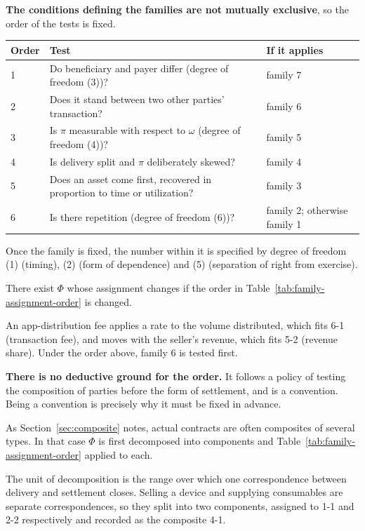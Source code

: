 \textbf{The conditions defining the families are not mutually exclusive}, so the order of
the tests is fixed.

\begin{center}
\begin{tabularx}{\textwidth}{@{}llX@{}}
\toprule
Order & Test & If it applies \\
\midrule
1 & Do beneficiary and payer differ (degree of freedom (3))? & family 7 \\
2 & Does it stand between two other parties' transaction? & family 6 \\
3 & Is $\pi$ measurable with respect to $\omega$ (degree of freedom (4))? & family 5 \\
4 & Is delivery split and $\pi$ deliberately skewed? & family 4 \\
5 & Does an asset come first, recovered in proportion to time or utilization? & family 3 \\
6 & Is there repetition (degree of freedom (6))? & family 2; otherwise family 1 \\
\bottomrule
\end{tabularx}
\label{tab:family-assignment-order}
\end{center}

Once the family is fixed, the number within it is specified by degree of freedom (1)
(timing), (2) (form of dependence) and (5) (separation of right from exercise).

\begin{remark}
\label{rem:assignment-order-dependence}
There exist $\Phi$ whose assignment changes if the order in
Table~\ref{tab:family-assignment-order} is changed.

An app-distribution fee applies a rate to the volume distributed, which fits 6-1
(transaction fee), and moves with the seller's revenue, which fits 5-2 (revenue share).
Under the order above, family 6 is tested first.

\textbf{There is no deductive ground for the order.} It follows a policy of testing the
composition of parties before the form of settlement, and is a convention. Being a
convention is precisely why it must be fixed in advance.
\end{remark}

\begin{remark}
\label{rem:composite-assignment}
As Section~\ref{sec:composite} notes, actual contracts are often composites of several types.
In that case $\Phi$ is first decomposed into components and
Table~\ref{tab:family-assignment-order} applied to each.

The unit of decomposition is the range over which one correspondence between delivery and
settlement closes. Selling a device and supplying consumables are separate correspondences,
so they split into two components, assigned to 1-1 and 2-2 respectively and recorded as the
composite 4-1.
\end{remark}

